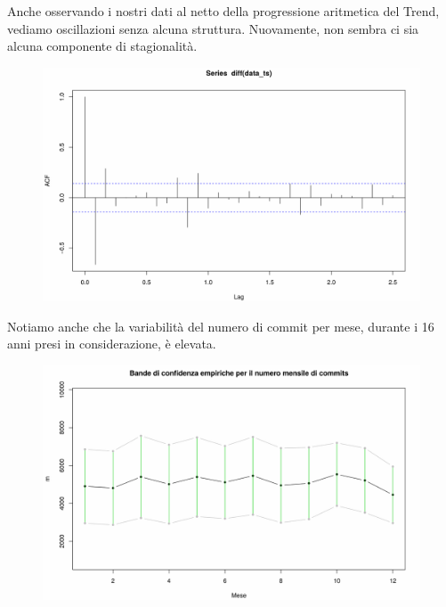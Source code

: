 \documentclass[11pt,a4paper]{article}
\begin{document}
\noindent
Anche osservando i nostri dati al netto della progressione aritmetica
del Trend, vediamo oscillazioni senza alcuna struttura. Nuovamente, non sembra
ci sia alcuna componente di stagionalit\`a.
\clearpage
\begin{figure}[H]
	\vspace{-1.5cm}
	\includegraphics[scale=0.6]{imgs/acf_diff.pdf}
	\vspace{-0.8cm}
\end{figure}
\noindent
Notiamo anche che la variabilit\`a del numero di commit per mese, durante i
16 anni presi in considerazione, \`e elevata.
\begin{figure}[H]
	\vspace{-0.3cm}
	\includegraphics[scale=0.6]{imgs/variance.pdf}
	\vspace{-0.9cm}
\end{figure}
\end{document}
